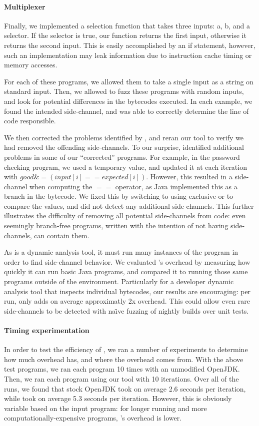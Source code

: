 \paragraph{Multiplexer}
Finally, we implemented a selection function that takes three inputs: a, b, and
a selector. If the selector is true, our function returns the first input,
otherwise it returns the second input. This is easily accomplished by an if
statement, however, such an implementation may leak information due to instruction cache timing or
memory accesses.



For each of these programs, we allowed them to take a single input as a string
on standard input. Then, we allowed \jcupid to fuzz these programs with random
inputs, and look for potential differences in the bytecodes executed. In each
example, we found the intended side-channel, and \jcupid was able to correctly
determine the line of code responsible.

We then corrected the problems identified by \jcupid, and reran our tool to
verify we had removed the offending side-channels. To our surprise, \jcupid
identified additional problems in some of our ``corrected'' programs. For example, in
the password checking program, we used a temporary value, and updated it at each
iteration with $ good \&= (input[i] == expected[i]) $. However, this resulted in
a side-channel when computing the $ == $ operator, as Java implemented this as a
branch in the bytecode. We fixed this by switching to using exclusive-or to
compare the values, and \jcupid did not detect any additional side-channels. This
further illustrates the difficulty of removing all potential side-channels from
code: even seemingly branch-free programs, written with the intention of not
having side-channels, can contain them.


As \jcupid is a dynamic analysis tool, it must run many instances of the program
in order to find side-channel behavior. We evaluated \jcupid's overhead by
measuring how quickly it can run basic Java programs, and compared it to
running those same programs outside of the \jcupid environment. Particularly for
a developer dynamic analysis tool that inspects individual bytecodes, our
results are encouraging: per run, \jcupid only adds on average approximatly 2x
overhead. This could allow even rare side-channels to be detected with
na\"{\i}ve fuzzing of nightly builds over unit tests.

\paragraph{Timing experimentation}
In order to test the efficiency of \jcupid, we ran a number of experiments to
determine how much overhead \jcupid has, and where the overhead comes from.
With the above test programs, we ran each program 10 times with an unmodified
OpenJDK. Then, we ran each program using our tool with 10 iterations. Over all
of the runs, we found that stock OpenJDK took on average 2.6 seconds per
iteration, while \jcupid took on average 5.3 seconds per iteration. However, this
is obviously variable based on the input program: for longer running and more
computationally-expensive programs, \jcupid's overhead is lower.

